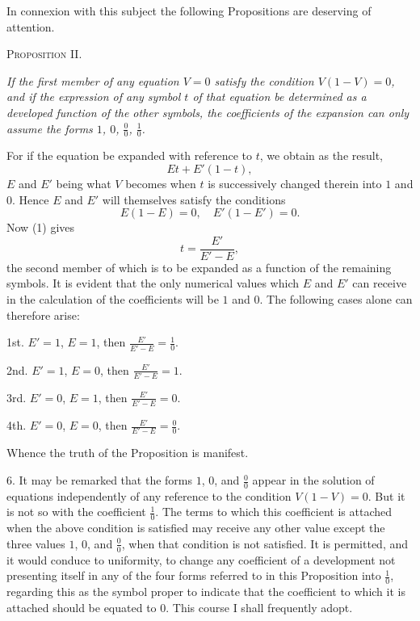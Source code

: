 \documentclass[oneside]{book}
\begin{document}
In connexion with this subject the following Propositions are
deserving of attention.

\begin{center}
\textsc{Proposition II.}
\end{center}

\textit{If the first member of any equation $V = 0$ satisfy the condition
$V(1-V) = 0$, and if the expression of any symbol $t$ of that equation
be determined as a developed function of the other symbols, the
coefficients of the expansion can only assume the forms $1$, $0$, $\displaystyle\frac{0}{0}$, $\displaystyle\frac{1}{0}$.}

For if the equation be expanded with reference to $t$, we obtain
as the result,
\setcounter{equation}{0}
\begin{equation}
Et + E'(1 - t),
\end{equation}
$E$ and $E'$ being what $V$ becomes when $t$ is successively changed
therein into $1$ and $0$. Hence $E$ and $E'$ will themselves satisfy
the conditions
\begin{equation}
E(1 - E) = 0,\quad E'(1 - E') = 0.
\end{equation}
Now (1) gives
\[
t = \frac{E'}{E' - E},
\]
the second member of which is to be expanded as a function of
the remaining symbols. It is evident that the only numerical
values which $E$ and $E'$ can receive in the calculation of the coefficients
will be $1$ and $0$. The following cases alone can therefore
arise:

1st. $E' = 1$, $E = 1$, then $\displaystyle\frac{E'}{E'-E} = \frac{1}{0}$.

2nd. $E' = 1$, $E = 0$, then $\displaystyle\frac{E'}{E'-E} = 1$.

3rd. $E' = 0$, $E = 1$, then $\displaystyle\frac{E'}{E'-E} = 0$.

4th. $E' = 0$, $E = 0$, then $\displaystyle\frac{E'}{E'-E} = \frac{0}{0}$.

Whence the truth of the Proposition is manifest.

6. It may be remarked that the forms $1$, $0$, and $\frac{0}{0}$ appear in
the solution of equations independently of any reference to the
condition $V(1 - V) = 0$. But it is not so with the coefficient $\frac{1}{0}$.
The terms to which this coefficient is attached when the above
condition is satisfied may receive any other value except the
three values $1$, $0$, and $\frac{0}{0}$, when that condition is not satisfied. It
is permitted, and it would conduce to uniformity, to change any
coefficient of a development not presenting itself in any of the
four forms referred to in this Proposition into $\frac{1}{0}$, regarding this
as the symbol proper to indicate that the coefficient to which it is
attached should be equated to $0$. This course I shall frequently
adopt.
\end{document}
